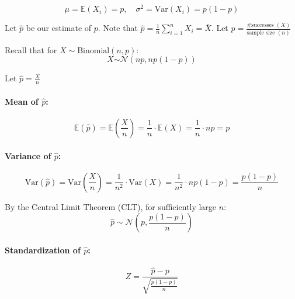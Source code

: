 \[
\mu = \mathbb{E}(X_i) = p, \quad \sigma^2 = \mathrm{Var}(X_i) = p(1 - p)
\]

Let $\hat{p}$ be our estimate of $p$. Note that $\hat{p} = \frac{1}{n} \sum_{i=1}^{n} X_i = \bar{X}$.
Let $\hat{p} = \frac{\text{\# successes } (X)}{\text{sample size } (n)}$

Recall that for $X \sim \text{Binomial}(n, p)$:
\[
X \overset{\cdot}{\sim} \mathcal{N}(np, np(1 - p))
\]

Let $\hat{p} = \frac{X}{n}$

\paragraph*{Mean of $\hat{p}$:}

\[
\mathbb{E}(\hat{p}) = \mathbb{E} \left( \frac{X}{n} \right) = \frac{1}{n} \cdot \mathbb{E}(X) = \frac{1}{n} \cdot np = p
\]

\paragraph*{Variance of $\hat{p}$:}

\[
\mathrm{Var}(\hat{p}) = \mathrm{Var} \left( \frac{X}{n} \right) = \frac{1}{n^2} \cdot \mathrm{Var}(X) = \frac{1}{n^2} \cdot np(1 - p) = \frac{p(1 - p)}{n}
\]

By the Central Limit Theorem (CLT), for sufficiently large $n$:
\[
\hat{p} \sim \mathcal{N} \left( p, \frac{p(1 - p)}{n} \right)
\]

\paragraph*{Standardization of $\hat{p}$:}
\[
Z = \frac{\hat{p} - p}{\sqrt{ \frac{p(1 - p)}{n} }}
\]

